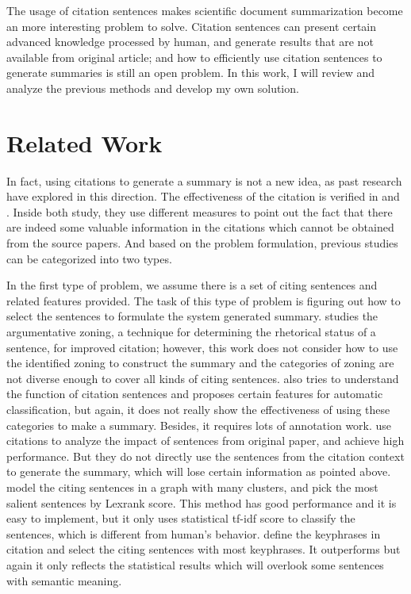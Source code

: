 \documentclass[hyp]{socreport}
\begin{document}
The usage of citation sentences makes scientific document summarization become an more interesting problem to solve. Citation sentences can present certain advanced knowledge processed by human, and generate results that are not available from original article; and how to efficiently use citation sentences to generate summaries is still an open problem. In this work, I will review and analyze the previous methods and develop my own solution.

\section{Related Work}

  In fact, using citations to generate a summary is not a new idea, as past research have explored in this direction. The effectiveness of the citation is verified in \citep{elkiss2008} and \citep{mohammad2009}. Inside both study, they use different measures to point out the fact that there are indeed some valuable information in the citations which cannot be obtained from the source papers. And based on the problem formulation, previous studies can be categorized into two types. 

In the first type of problem, we assume there is a set of citing sentences and related features provided. The task of this type of problem is figuring out how to select the sentences to formulate the system generated summary. \citep{teufel2005} studies the argumentative zoning, a technique for determining the rhetorical status of a sentence, for improved citation; however, this work does not consider how to use the identified zoning to construct the summary and the categories of zoning are not diverse enough to cover all kinds of citing sentences. \citep{teufel2006} also tries to understand the function of citation sentences and proposes certain features for automatic classification, but again, it does not really show the effectiveness of using these categories to make a summary. Besides, it requires lots of annotation work. \citep{mei2008} use citations to analyze the impact of sentences from original paper, and achieve high performance. But they do not directly use the sentences from the citation context to generate the summary, which will lose certain information as pointed above. \citep{qazvinian2008} model the citing sentences in a graph with many clusters, and pick the most salient sentences by Lexrank score. This method has good performance and it is easy to implement, but it only uses statistical tf-idf score to classify the sentences, which is different from human's behavior. \citep{qazvinian2010} define the keyphrases in citation and select the citing sentences with most keyphrases. It outperforms \citep{qazvinian2008} but again it only reflects the statistical results which will overlook some sentences with semantic meaning.  
\end{document}
